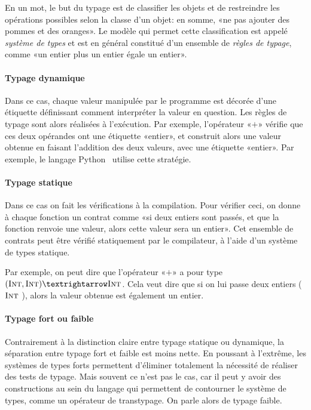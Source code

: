 En un mot, le but du typage est de classifier les objets et de restreindre les
opérations possibles selon la classe d'un objet: en somme, «ne pas ajouter des
pommes et des oranges». Le modèle qui permet cette classification est appelé
\emph{système de types} et est en général constitué d'un ensemble de
\emph{règles de typage}, comme «un entier plus un entier égale un entier».

\paragraph{Typage dynamique}

Dans ce cas, chaque valeur manipulée par le programme est décorée d'une
étiquette définissant comment interpréter la valeur en question. Les règles de
typage sont alors réalisées à l'exécution. Par exemple, l'opérateur «$+$»
vérifie que ces deux opérandes ont une étiquette «entier», et construit alors
une valeur obtenue en faisant l'addition des deux valeurs, avec une étiquette
«entier». Par exemple, le langage Python~ utilise cette
stratégie.

\paragraph{Typage statique}

Dans ce cas on fait les vérifications à la compilation. Pour vérifier ceci, on
donne à chaque fonction un contrat comme «si deux entiers sont passés, et que
la fonction renvoie une valeur, alors cette valeur sera un entier». Cet
ensemble de contrats peut être vérifié statiquement par le compilateur, à l'aide
d'un système de types statique.

Par exemple, on peut dire que l'opérateur «$+$» a pour type $(\tInt, \tInt) →
\tInt$. Cela veut dire que si on lui passe deux entiers ($\textsc{Int}$ \tInt), alors
la valeur obtenue est également un entier.

\paragraph{Typage fort ou faible}

Contrairement à la distinction claire entre typage statique ou dynamique, la
séparation entre typage fort et faible est moins nette. En poussant à l'extrême,
les systèmes de types forts permettent d'éliminer totalement la nécessité de
réaliser des tests de typage. Mais souvent ce n'est pas le cas, car il peut y
avoir des constructions au sein du langage qui permettent de contourner le
système de types, comme un opérateur de transtypage. On parle alors de typage
faible.

